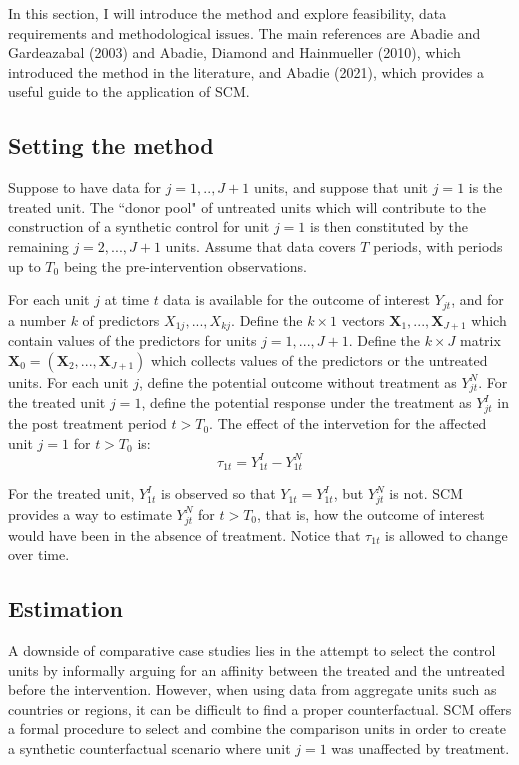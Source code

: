 \documentclass[12pt,a4paper,draft]{article}
\begin{document}
In this section, I will introduce the method and explore feasibility, 
data requirements and methodological issues. 
The main references are Abadie and Gardeazabal (2003) and Abadie, Diamond and 
Hainmueller (2010), which introduced the method in the literature, and Abadie 
(2021), which provides a useful guide to the application of SCM.


\subsection{Setting the method}

Suppose to have data for $j=1,..,J+1$ units, and suppose that unit $j=1$ is the 
treated unit. The ``donor pool" of untreated units which will contribute to the 
construction of a synthetic control for unit $j=1$ is then constituted by the 
remaining $j=2,...,J+1$ units.
Assume that data covers $T$ periods, with periods up to $T_0$ being the 
pre-intervention observations.

For each unit $j$ at time $t$ data is available for the outcome of interest 
$Y_{jt}$, and for a number $k$ of predictors $X_{1j}, ..., X_{kj}$. Define the 
$k \times 1$ vectors $\mathbf{X}_1, ..., \mathbf{X}_{J+1}$ which contain values
of the predictors for units $j=1,...,J+1$. Define the $k \times J$ matrix 
$\mathbf{X}_0= \left(\mathbf{X}_2,..., \mathbf{X}_{J+1}\right)$ which collects values of the predictors 
or the untreated units.
For each unit $j$, define the potential outcome without treatment as $Y_{jt}^N$.
For the treated unit $j=1$, define the potential response under the treatment as 
$Y_{jt}^I$ in the post treatment period $t>T_0$. The effect of the intervetion 
for the affected unit $j=1$ for $t>T_0$ is: 
\begin{equation}
\tau_{1t}=Y_{1t}^I-Y_{1t}^N
\end{equation}

For the treated unit, $Y_{1t}^I$ is observed so that  $Y_{1t}=Y_{1t}^I$, but $Y_{jt}^N$ is not. 
SCM provides a way to estimate $Y_{jt}^N$ for $t>T_0$, that is, how the outcome 
of interest would have been in the absence of treatment. Notice that $\tau_{1t}$
is allowed to change over time.



\subsection{Estimation} %

A downside of comparative case studies lies in the attempt to select the control 
units by informally arguing for an affinity between the treated and the untreated 
before the intervention. However, when using data from aggregate units such as 
countries or regions, it can be difficult to find a proper counterfactual.
SCM offers a formal procedure to select and combine the comparison units in order
to create a synthetic counterfactual scenario where unit $j=1$ was unaffected by treatment.
\end{document}
